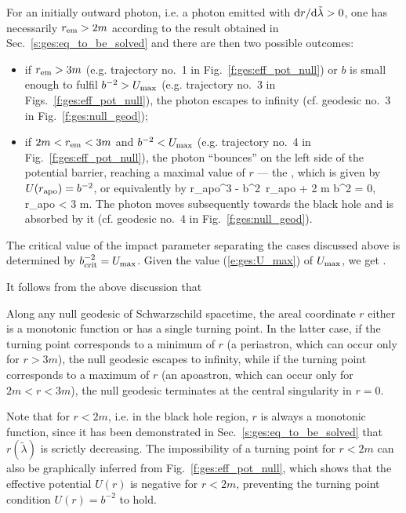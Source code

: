 For an initially outward photon, i.e. a photon emitted with ${\mathrm{d} r}/{\mathrm{d}\tilde{\lambda}} > 0$,
one has necessarily $r_{\rm em}>2m$ according to the result obtained in Sec.~\ref{s:ges:eq_to_be_solved}
and there are then two possible outcomes:

\begin{itemize}
\item if $r_{\rm em} > 3 m$ (e.g. trajectory
no.~1 in Fig.~\ref{f:ges:eff_pot_null}) or
$b$ is small enough to fulfil $b^{-2} > U_{\rm max}$ (e.g. trajectory
no.~3 in Figs.~\ref{f:ges:eff_pot_null}), the photon escapes to infinity
(cf. geodesic no.~3 in Fig.~\ref{f:ges:null_geod});
\item if $2m < r_{\rm em} < 3 m$ and $b^{-2} < U_{\rm max}$ (e.g. trajectory
no.~4 in Fig.~\ref{f:ges:eff_pot_null}), the photon ``bounces'' on the left
side of the potential barrier, reaching a maximal value of $r$
--- the ,
which is given by  $U(r_{\rm apo}) = b^{-2}$, or equivalently by
\be \label{e:ges:r_apo_null}
   r_{\rm apo}^3 - b^2\, r_{\rm apo} + 2 m b^2 = 0, \quad r_{\rm apo} < 3 m.
\ee
The photon moves subsequently towards the black hole and
is absorbed by it (cf. geodesic no.~4 in Fig.~\ref{f:ges:null_geod}).
\end{itemize}

The critical value of the impact parameter separating the cases discussed
above is determined by $b_{\rm crit}^{-2} = U_{\rm max}$.
Given the value (\ref{e:ges:U_max}) of $U_{\rm max}$, we get
\be \label{e:ges:b_crit}
    .
\ee

It follows from the above discussion that
\begin{greybox}
Along any null geodesic of Schwarzschild spacetime, the areal coordinate $r$
either is a monotonic function or has a single turning point. In the latter case,
if the turning point corresponds to a minimum of $r$ (a periastron, which can occur
only for $r>3m$), the null geodesic escapes to infinity, while if the turning
point corresponds to a maximum of $r$ (an apoastron, which can occur only for $2m<r<3m$), the
null geodesic terminates at the central singularity in $r=0$.
\end{greybox}
Note that for $r<2m$, i.e. in the black hole region, $r$
is always a monotonic function, since it has been demonstrated in
Sec.~\ref{s:ges:eq_to_be_solved} that $r(\tilde{\lambda})$ is scrictly
decreasing. The impossibility of a turning point for $r<2m$ can also be
graphically inferred from Fig.~\ref{f:ges:eff_pot_null}, which shows
that the effective potential $U(r)$ is negative for $r<2m$,
preventing the turning point condition $U(r) = b^{-2}$ to hold.

